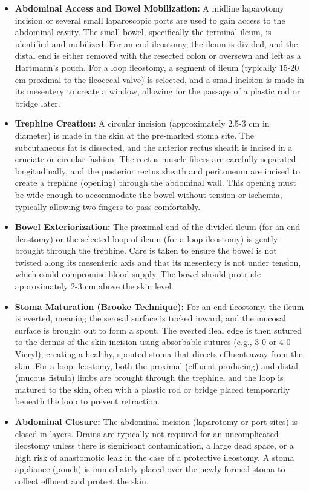 \begin{itemize}
  \item \textbf{Abdominal Access and Bowel Mobilization:} A midline laparotomy incision or several small laparoscopic ports are used to gain access to the abdominal cavity. The small bowel, specifically the terminal ileum, is identified and mobilized. For an end ileostomy, the ileum is divided, and the distal end is either removed with the resected colon or oversewn and left as a Hartmann's pouch. For a loop ileostomy, a segment of ileum (typically 15-20 cm proximal to the ileocecal valve) is selected, and a small incision is made in its mesentery to create a window, allowing for the passage of a plastic rod or bridge later.
  
  \item \textbf{Trephine Creation:} A circular incision (approximately 2.5-3 cm in diameter) is made in the skin at the pre-marked stoma site. The subcutaneous fat is dissected, and the anterior rectus sheath is incised in a cruciate or circular fashion. The rectus muscle fibers are carefully separated longitudinally, and the posterior rectus sheath and peritoneum are incised to create a trephine (opening) through the abdominal wall. This opening must be wide enough to accommodate the bowel without tension or ischemia, typically allowing two fingers to pass comfortably.
  
  \item \textbf{Bowel Exteriorization:} The proximal end of the divided ileum (for an end ileostomy) or the selected loop of ileum (for a loop ileostomy) is gently brought through the trephine. Care is taken to ensure the bowel is not twisted along its mesenteric axis and that its mesentery is not under tension, which could compromise blood supply. The bowel should protrude approximately 2-3 cm above the skin level.
  
  \item \textbf{Stoma Maturation (Brooke Technique):} For an end ileostomy, the ileum is everted, meaning the serosal surface is tucked inward, and the mucosal surface is brought out to form a spout. The everted ileal edge is then sutured to the dermis of the skin incision using absorbable sutures (e.g., 3-0 or 4-0 Vicryl), creating a healthy, spouted stoma that directs effluent away from the skin. For a loop ileostomy, both the proximal (effluent-producing) and distal (mucous fistula) limbs are brought through the trephine, and the loop is matured to the skin, often with a plastic rod or bridge placed temporarily beneath the loop to prevent retraction.
  
  \item \textbf{Abdominal Closure:} The abdominal incision (laparotomy or port sites) is closed in layers. Drains are typically not required for an uncomplicated ileostomy unless there is significant contamination, a large dead space, or a high risk of anastomotic leak in the case of a protective ileostomy. A stoma appliance (pouch) is immediately placed over the newly formed stoma to collect effluent and protect the skin.
\end{itemize}

